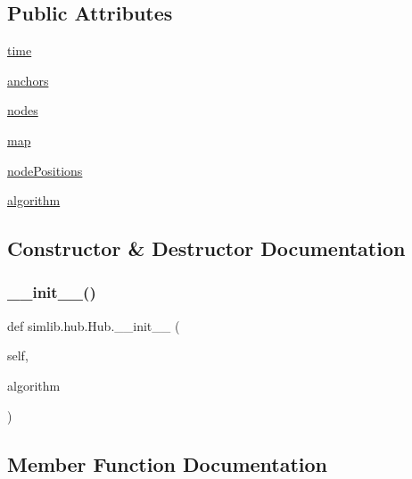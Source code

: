 \subsection*{Public Attributes}
\begin{DoxyCompactItemize}
\item 
\mbox{\hyperlink{classsimlib_1_1hub_1_1_hub_a7db7bfdb073f30c1743c759f80e7bee0}{time}}
\item 
\mbox{\hyperlink{classsimlib_1_1hub_1_1_hub_a0029749fffb5dea111be831a18180a01}{anchors}}
\item 
\mbox{\hyperlink{classsimlib_1_1hub_1_1_hub_a61a34379fa5ce06d05763918fa3c619d}{nodes}}
\item 
\mbox{\hyperlink{classsimlib_1_1hub_1_1_hub_a04337df384aca498eb332aa200675754}{map}}
\item 
\mbox{\hyperlink{classsimlib_1_1hub_1_1_hub_a6fde0d1ce43d4b1ad2b98413b157d650}{node\+Positions}}
\item 
\mbox{\hyperlink{classsimlib_1_1hub_1_1_hub_aca8e342d4c6bc56b75d88e0c715f817c}{algorithm}}
\end{DoxyCompactItemize}


\subsection{Constructor \& Destructor Documentation}
\mbox{\label{classsimlib_1_1hub_1_1_hub_aef9d9e20c18f3529bc77a67785994a3d}} 
\subsubsection{\texorpdfstring{\+\_\+\+\_\+init\+\_\+\+\_\+()}{\_\_init\_\_()}}
{\footnotesize\ttfamily def simlib.\+hub.\+Hub.\+\_\+\+\_\+init\+\_\+\+\_\+ (\begin{DoxyParamCaption}\item[{}]{self,  }\item[{}]{algorithm }\end{DoxyParamCaption})}



\subsection{Member Function Documentation}
\mbox{\label{classsimlib_1_1hub_1_1_hub_aa1690052a9b14a68a6dff3dba2d8103e}} 
